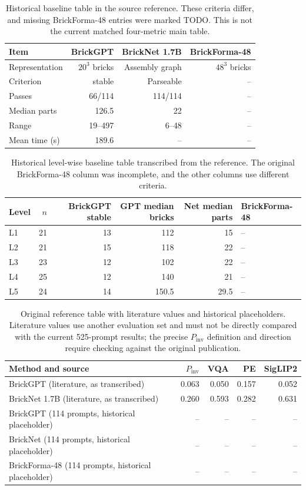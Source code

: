 \begin{table}[!htbp]\centering\small
\begin{tabular}{lrrr}\toprule
Item & BrickGPT & BrickNet 1.7B & BrickForma-48 \\ \midrule
Representation & $20^3$ bricks & Assembly graph & $48^3$ bricks \\
Criterion & stable & Parseable & -- \\
Passes & 66/114 & 114/114 & -- \\
Median parts & 126.5 & 22 & -- \\
Range & 19--497 & 6--48 & -- \\
Mean time (s) & 189.6 & -- & -- \\
\bottomrule\end{tabular}
\caption{Historical baseline table in the source reference. These criteria differ, and missing BrickForma-48 entries were marked TODO. This is not the current matched four-metric main table.}
\end{table}

\begin{table}[!htbp]\centering\small
\begin{tabular}{lrrrrl}\toprule
Level & $n$ & BrickGPT stable & GPT median bricks & Net median parts & BrickForma-48 \\ \midrule
L1 & 21 & 13 & 112 & 15 & -- \\
L2 & 21 & 15 & 118 & 22 & -- \\
L3 & 23 & 12 & 102 & 22 & -- \\
L4 & 25 & 12 & 140 & 21 & -- \\
L5 & 24 & 14 & 150.5 & 29.5 & -- \\
\bottomrule\end{tabular}
\caption{Historical level-wise baseline table transcribed from the reference. The original BrickForma-48 column was incomplete, and the other columns use different criteria.}
\end{table}

\begin{table}[!htbp]\centering\small
\begin{tabular}{lrrrr}\toprule
Method and source & $P_{\mathrm{inv}}$ & VQA & PE & SigLIP2 \\ \midrule
BrickGPT (literature, as transcribed) & 0.063 & 0.050 & 0.157 & 0.052 \\
BrickNet 1.7B (literature, as transcribed) & 0.260 & 0.593 & 0.282 & 0.631 \\
BrickGPT (114 prompts, historical placeholder) & -- & -- & -- & -- \\
BrickNet (114 prompts, historical placeholder) & -- & -- & -- & -- \\
BrickForma-48 (114 prompts, historical placeholder) & -- & -- & -- & -- \\
\bottomrule\end{tabular}
\caption{Original reference table with literature values and historical placeholders. Literature values use another evaluation set and must not be directly compared with the current 525-prompt results; the precise $P_{\mathrm{inv}}$ definition and direction require checking against the original publication.}
\end{table}

